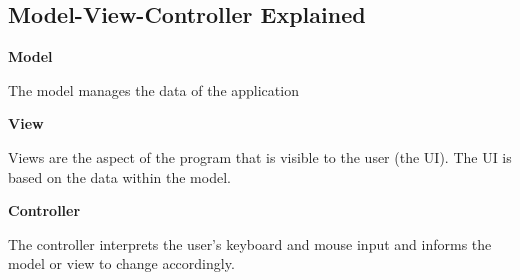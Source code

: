 \subsection{Model-View-Controller Explained}

\noindent
\textbf{Model}

\noindent
The model manages the data of the application\cite{modelviewcontroller}

\vspace{5 mm}
\noindent
\textbf{View}

\noindent
Views are the aspect of the program that is visible to the user (the UI). The UI is based on the data within the 
model\cite{mvcasp}.

\vspace{5 mm}
\noindent
\textbf{Controller}

\noindent
The controller interprets the user's keyboard and mouse input and informs the model or view to change 
accordingly\cite{mvcasp}.